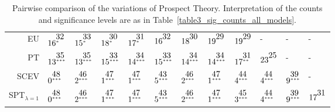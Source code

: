 \documentclass[a4paper]{article}\usepackage[]{graphicx}\usepackage[]{color}
\renewcommand{\tabcolsep}{3pt}
\renewenvironment{table*}[1][1]{
  \begin{table}[#1]\footnotesize
    \begin{adjustwidth}{-1cm}{}
    }{
    \end{adjustwidth}
  \end{table}}
\begin{document}
\begin{table*}[!htb]
\begin{tabular}{rlllllllllll}
  EU & $16^{\stackrel{\textstyle32\hfill}{\scriptscriptstyle*\hfill}}$ & $15^{\stackrel{\textstyle33\hfill}{\scriptscriptstyle*\hfill}}$ & $18^{\stackrel{\textstyle30\hfill}{\scriptscriptstyle*\hfill}}$ & $17^{\stackrel{\textstyle31\hfill}{\scriptscriptstyle*\hfill}}$ & $16^{\stackrel{\textstyle32\hfill}{\scriptscriptstyle\hfill}}$ & $18^{\stackrel{\textstyle30\hfill}{\scriptscriptstyle\hfill}}$ & $19^{\stackrel{\textstyle29\hfill}{\scriptscriptstyle\hfill}}$ & $19^{\stackrel{\textstyle29\hfill}{\scriptscriptstyle\hfill}}$ & - & - & - \\ 
  PT & $13^{\stackrel{\textstyle35\hfill}{\scriptscriptstyle***\hfill}}$ & $13^{\stackrel{\textstyle35\hfill}{\scriptscriptstyle***\hfill}}$ & $15^{\stackrel{\textstyle33\hfill}{\scriptscriptstyle***\hfill}}$ & $14^{\stackrel{\textstyle34\hfill}{\scriptscriptstyle***\hfill}}$ & $15^{\stackrel{\textstyle33\hfill}{\scriptscriptstyle***\hfill}}$ & $14^{\stackrel{\textstyle34\hfill}{\scriptscriptstyle***\hfill}}$ & $14^{\stackrel{\textstyle34\hfill}{\scriptscriptstyle***\hfill}}$ & $17^{\stackrel{\textstyle31\hfill}{\scriptscriptstyle**\hfill}}$ & $23^{\stackrel{\textstyle25\hfill}{\scriptscriptstyle\hfill}}$ & - & - \\ 
  SCEV & $0^{\stackrel{\textstyle48\hfill}{\scriptscriptstyle***\hfill}}$ & $2^{\stackrel{\textstyle46\hfill}{\scriptscriptstyle***\hfill}}$ & $1^{\stackrel{\textstyle47\hfill}{\scriptscriptstyle***\hfill}}$ & $1^{\stackrel{\textstyle47\hfill}{\scriptscriptstyle***\hfill}}$ & $5^{\stackrel{\textstyle43\hfill}{\scriptscriptstyle***\hfill}}$ & $2^{\stackrel{\textstyle46\hfill}{\scriptscriptstyle***\hfill}}$ & $1^{\stackrel{\textstyle47\hfill}{\scriptscriptstyle***\hfill}}$ & $4^{\stackrel{\textstyle44\hfill}{\scriptscriptstyle***\hfill}}$ & $4^{\stackrel{\textstyle44\hfill}{\scriptscriptstyle***\hfill}}$ & $9^{\stackrel{\textstyle39\hfill}{\scriptscriptstyle***\hfill}}$ & - \\ 
  SPT$_{\lambda = 1}$ & $0^{\stackrel{\textstyle48\hfill}{\scriptscriptstyle***\hfill}}$ & $2^{\stackrel{\textstyle46\hfill}{\scriptscriptstyle***\hfill}}$ & $1^{\stackrel{\textstyle47\hfill}{\scriptscriptstyle***\hfill}}$ & $1^{\stackrel{\textstyle47\hfill}{\scriptscriptstyle***\hfill}}$ & $5^{\stackrel{\textstyle43\hfill}{\scriptscriptstyle***\hfill}}$ & $2^{\stackrel{\textstyle46\hfill}{\scriptscriptstyle***\hfill}}$ & $1^{\stackrel{\textstyle47\hfill}{\scriptscriptstyle***\hfill}}$ & $3^{\stackrel{\textstyle45\hfill}{\scriptscriptstyle***\hfill}}$ & $4^{\stackrel{\textstyle44\hfill}{\scriptscriptstyle***\hfill}}$ & $9^{\stackrel{\textstyle39\hfill}{\scriptscriptstyle***\hfill}}$ & $17^{\stackrel{\textstyle31\hfill}{\scriptscriptstyle\hfill}}$ \\ 
   \hline
\end{tabular}
\caption{Pairwise comparison of the variations of Prospect Theory. Interpretation of the counts and significance levels are as in Table~\ref{table3_sig_counts_all_models}.} 
\label{table5_sig_counts_PT_models}
\end{table*}
\end{document}
